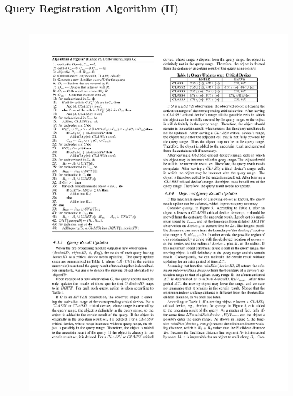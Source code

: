 
\begin{frame}
\frametitle{Query Registration Algorithm (II)}

\begin{columns}[c]

  \begin{figure}[tb]
    \includegraphics[width=\columnwidth]{figures/2-2/2-2-8.pdf}
  \end{figure}


\end{columns}
\end{frame}
